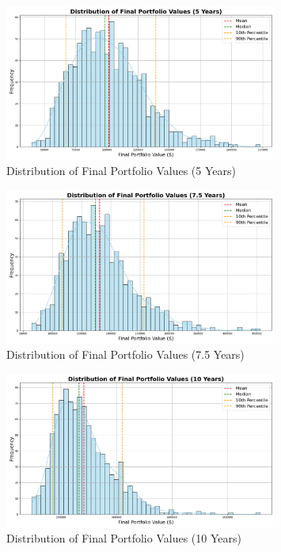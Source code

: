 \begin{figure}[!htbp]
    \centering
    \includegraphics[width=0.8\textwidth]{../Figures/final_portfolio_values_distribution_5_years.png}
    \caption{Distribution of Final Portfolio Values (5 Years)}
    \label{fig:final_portfolio_values_5y}
\end{figure}

\begin{figure}[!htbp]
    \centering
    \includegraphics[width=0.8\textwidth]{../Figures/final_portfolio_values_distribution_7_5_years.png}
    \caption{Distribution of Final Portfolio Values (7.5 Years)}
    \label{fig:final_portfolio_values_7_5y}
\end{figure}

\begin{figure}[!htbp]
    \centering
    \includegraphics[width=0.8\textwidth]{../Figures/final_portfolio_values_distribution_10_years.png}
    \caption{Distribution of Final Portfolio Values (10 Years)}
    \label{fig:final_portfolio_values_10y}
\end{figure}

